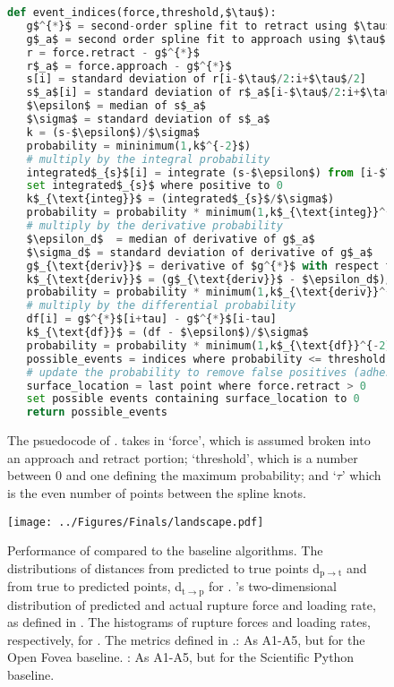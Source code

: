 \begin{figure}[htp]
\caption[\name{} psuedocode]{\noindent{} The psuedocode of \name{}. \name{} takes in `force', which is assumed broken into an approach and retract portion; `threshold', which is a number between 0 and one defining the maximum probability; and `$\tau$' which is the even number of points between the spline knots.  }
  \begin{lstlisting}[language=Python]
def event_indices(force,threshold,$\tau$):
   g$^{*}$ = second-order spline fit to retract using $\tau$ for knots
   g$_a$ = second order spline fit to approach using $\tau$ for knots
   r = force.retract - g$^{*}$
   r$_a$ = force.approach - g$^{*}$
   s[i] = standard deviation of r[i-$\tau$/2:i+$\tau$/2]
   s$_a$[i] = standard deviation of r$_a$[i-$\tau$/2:i+$\tau$/2]
   $\epsilon$ = median of s$_a$
   $\sigma$ = standard deviation of s$_a$
   k = (s-$\epsilon$)/$\sigma$
   probability = mininimum(1,k$^{-2}$)
   # multiply by the integral probability 
   integrated$_{s}$[i] = integrate (s-$\epsilon$) from [i-$\tau$] to [i+$\tau$]
   set integrated$_{s}$ where positive to 0
   k$_{\text{integ}}$ = (integrated$_{s}$/$\sigma$)
   probability = probability * minimum(1,k$_{\text{integ}}^{-2}$)
   # multiply by the derivative probability
   $\epsilon_d$  = median of derivative of g$_a$
   $\sigma_d$ = standard deviation of derivative of g$_a$
   g$_{\text{deriv}}$ = derivative of $g^{*}$ with respect to time
   k$_{\text{deriv}}$ = (g$_{\text{deriv}}$ - $\epsilon_d$)/$\sigma_d$
   probability = probability * minimum(1,k$_{\text{deriv}}^{-2}$)
   # multiply by the differential probability 
   df[i] = g$^{*}$[i+tau] - g$^{*}$[i-tau]
   k$_{\text{df}}$ = (df - $\epsilon$)/$\sigma$
   probability = probability * minimum(1,k$_{\text{df}}^{-2}$)
   possible_events = indices where probability <= threshold
   # update the probability to remove false positives (adhesions)
   surface_location = last point where force.retract > 0
   set possible events containing surface_location to 0
   return possible_events
\end{lstlisting}
\end{figure}


\begin{figure}[htpb]
\caption[Algorithm Performance]{\noindent{} Performance of \name{} compared to the baseline algorithms.  The distributions of distances from predicted to true points d$_{\mathrm{p}\rightarrow\mathrm{t}}$ and from true to predicted points, d$_{\mathrm{t}\rightarrow\mathrm{p}}$ for \name{}.  \name{}'s two-dimensional distribution of predicted and actual rupture force and loading rate, as defined in .  The histograms of rupture forces and loading rates, respectively, for \name{}.   The metrics defined in .: As A1-A5, but for the Open Fovea baseline. : As A1-A5, but for the Scientific Python baseline.  }
\centering
\texttt{[image: ../Figures/Finals/landscape.pdf]}%
\end{figure}




